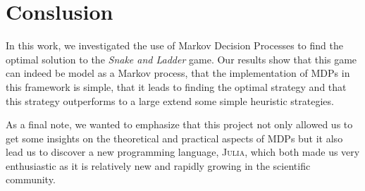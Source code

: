 \section{Conslusion} %
\label{sec:conclusion}
In this work, we investigated the use of Markov Decision Processes
to find the optimal solution to the \textit{Snake and Ladder} game. 
Our results show that this game can indeed be model as a Markov process, 
that the implementation of MDPs in this framework is simple,
that it leads to finding the optimal strategy and that this strategy
outperforms to a large extend some simple heuristic strategies. 

As a final note, we wanted to
emphasize that this project not only allowed us to get some
insights on the theoretical and practical aspects of MDPs
but it also lead us to discover a new programming language, \textsc{Julia},
which both made us very enthusiastic as it is relatively new
and rapidly growing in the scientific community.
